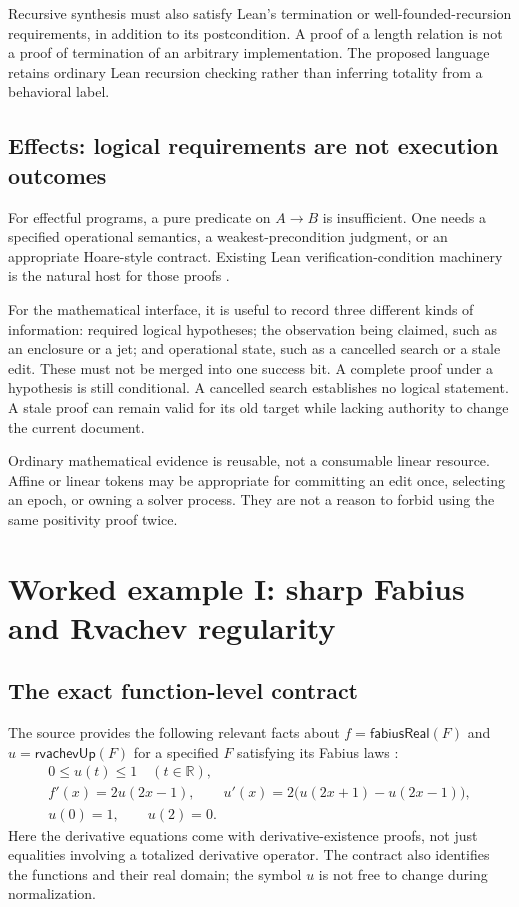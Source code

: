 \documentclass[11pt,a4paper]{article}
\theoremstyle{definition}
\theoremstyle{remark}
\newcommand{\R}{\mathbb R}
\begin{document}
Recursive synthesis must also satisfy Lean's termination or well-founded-recursion requirements, in addition to its postcondition. A proof of a length relation is not a proof of termination of an arbitrary implementation. The proposed language retains ordinary Lean recursion checking rather than inferring totality from a behavioral label.

\subsection{Effects: logical requirements are not execution outcomes}
For effectful programs, a pure predicate on $A\to B$ is insufficient. One needs a specified operational semantics, a weakest-precondition judgment, or an appropriate Hoare-style contract. Existing Lean verification-condition machinery is the natural host for those proofs \cite{leanTutorials,leanRelease}.

For the mathematical interface, it is useful to record three different kinds of information: required logical hypotheses; the observation being claimed, such as an enclosure or a jet; and operational state, such as a cancelled search or a stale edit. These must not be merged into one success bit. A complete proof under a hypothesis is still conditional. A cancelled search establishes no logical statement. A stale proof can remain valid for its old target while lacking authority to change the current document.

Ordinary mathematical evidence is reusable, not a consumable linear resource. Affine or linear tokens may be appropriate for committing an edit once, selecting an epoch, or owning a solver process. They are not a reason to forbid using the same positivity proof twice.

\section{Worked example I: sharp Fabius and Rvachev regularity}
\label{sec:fabius}

\subsection{The exact function-level contract}
The source provides the following relevant facts about $f=\mathsf{fabiusReal}(F)$ and $u=\mathsf{rvachevUp}(F)$ for a specified $F$ satisfying its Fabius laws \cite{regularity}:
\begin{gather}
 0\le u(t)\le1\quad(t\in\R),\label{eq:urange}\\
 f'(x)=2u(2x-1),\qquad
 u'(x)=2\bigl(u(2x+1)-u(2x-1)\bigr),\label{eq:flaws}\\
 u(0)=1,\qquad u(2)=0.\label{eq:uvalues}
\end{gather}
Here the derivative equations come with derivative-existence proofs, not just equalities involving a totalized derivative operator. The contract also identifies the functions and their real domain; the symbol $u$ is not free to change during normalization.
\end{document}
